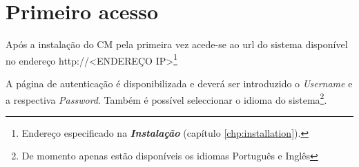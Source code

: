 \pagebreak


\section{Primeiro acesso}
\label{sec:first_access}
Após a instalação do CM pela primeira vez acede-se ao url do sistema disponível no endereço http://<ENDEREÇO IP>\footnote{Endereço especificado na {\bf \emph{Instalação}} (capítulo \ref{chp:installation}).}



A página de autenticação é disponibilizada e deverá ser introduzido o \emph{Username} e a respectiva \emph{Password}. Também é possível seleccionar o idioma do sistema\footnote{De momento apenas estão disponíveis os idiomas Português e Inglês}.

